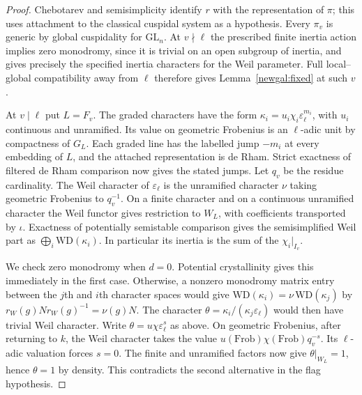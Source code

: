 \begin{proof}
Chebotarev and semisimplicity identify $r$ with the representation
of $\pi$; this uses attachment to the classical cuspidal system as
a hypothesis. Every $\pi_v$ is generic by global cuspidality for
$\mathrm{GL}_n$. At $v\nmid\ell$ the prescribed finite inertia action
implies zero monodromy, since it is trivial on an open subgroup of
inertia, and gives precisely the specified inertia characters for the
Weil parameter. Full local--global compatibility away from $\ell$
therefore gives Lemma~\ref{newgal:fixed} at such $v$.

At $v\mid\ell$ put $L=F_v$. The graded characters have the form
$\kappa_i=u_i\chi_i\varepsilon_\ell^{m_i}$, with $u_i$ continuous
and unramified. Its value on geometric Frobenius is an $\ell$-adic unit
by compactness of $G_L$. Each graded line has the labelled jump
$-m_i$ at every embedding of $L$, and the attached representation is
de Rham. Strict exactness of filtered de Rham comparison now gives
the stated jumps. Let $q_v$ be the residue cardinality. The Weil
character of $\varepsilon_\ell$ is the unramified character $\nu$
taking geometric Frobenius to $q_v^{-1}$. On a finite character and on
a continuous unramified character the Weil functor gives restriction
to $W_L$, with coefficients transported by $\iota$.
Exactness of potentially semistable comparison gives the
semisimplified Weil part as $\bigoplus_i\mathrm{WD}(\kappa_i)$.
In particular its inertia is the sum of the $\chi_i|_{I_v}$.

We check zero monodromy when $d=0$. Potential crystallinity gives this
immediately in the first case. Otherwise, a nonzero monodromy matrix
entry between the $j$th and $i$th character spaces would give
$\mathrm{WD}(\kappa_i)=\nu\,\mathrm{WD}(\kappa_j)$ by
$r_W(g)Nr_W(g)^{-1}=\nu(g)N$. The character
$\theta=\kappa_i/(\kappa_j\varepsilon_\ell)$ would then have trivial
Weil character. Write $\theta=u\chi\varepsilon_\ell^s$ as above. On
geometric Frobenius, after returning to $k$, the Weil character takes
the value $u(\mathrm{Frob})\chi(\mathrm{Frob})q_v^{-s}$. Its
$\ell$-adic valuation forces $s=0$. The finite and unramified factors
now give $\theta|_{W_L}=1$, hence $\theta=1$ by density. This contradicts
the second alternative in the flag hypothesis.


\end{proof}
